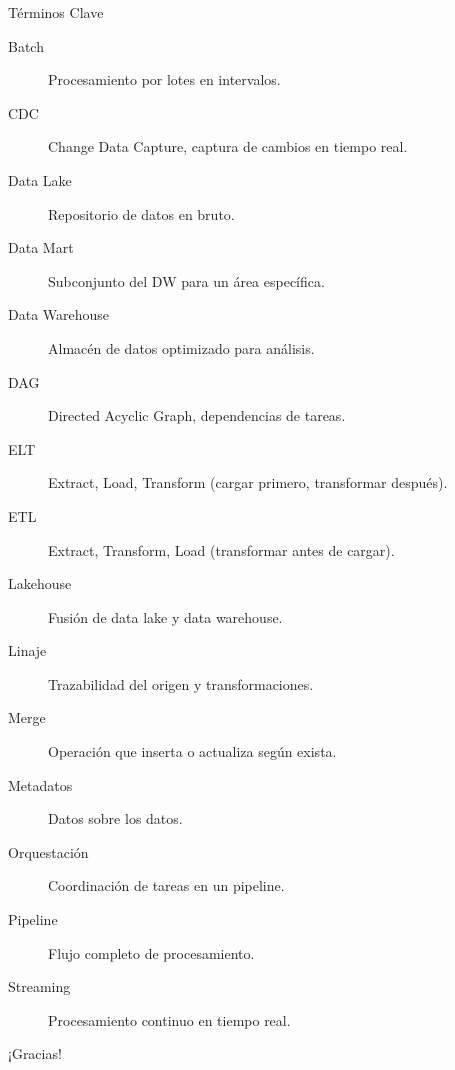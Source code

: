 \documentclass[aspectratio=169, 10pt, xcolor=table]{beamer}
\begin{document}
\begin{frame}{Términos Clave}
    \begin{description}
        \item[Batch] Procesamiento por lotes en intervalos.
        \item[CDC] Change Data Capture, captura de cambios en tiempo real.
        \item[Data Lake] Repositorio de datos en bruto.
        \item[Data Mart] Subconjunto del DW para un área específica.
        \item[Data Warehouse] Almacén de datos optimizado para análisis.
        \item[DAG] Directed Acyclic Graph, dependencias de tareas.
        \item[ELT] Extract, Load, Transform (cargar primero, transformar después).
        \item[ETL] Extract, Transform, Load (transformar antes de cargar).
        \item[Lakehouse] Fusión de data lake y data warehouse.
        \item[Linaje] Trazabilidad del origen y transformaciones.
        \item[Merge] Operación que inserta o actualiza según exista.
        \item[Metadatos] Datos sobre los datos.
        \item[Orquestación] Coordinación de tareas en un pipeline.
        \item[Pipeline] Flujo completo de procesamiento.
        \item[Streaming] Procesamiento continuo en tiempo real.
    \end{description}
\end{frame}

\begin{frame}
    \centering

    
    \vspace{1cm}
    \large ¡Gracias!
\end{frame}
\end{document}
